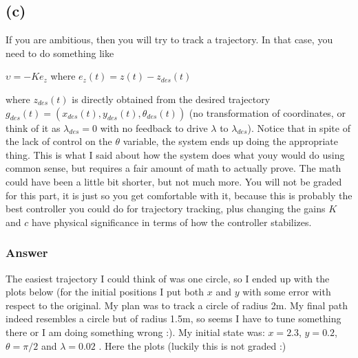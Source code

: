 \documentclass[10pt,a4paper]{article}
\begin{document}
\subsection*{(c)}
If you are ambitious, then you will try to track a trajectory. In that case, you need to do something like

\begin{center}
$\upsilon  = -Ke_{z}$ where $e_{z}(t) = z(t) - z_{des}(t)$
\end{center}

where $z_{des}(t)$ is directly obtained from the desired trajectory $g_{des}(t) = (x_{des}(t), y_{des}(t),\theta_{des}(t))$ (no transformation of coordinates, or think of it as $\lambda_{des} = 0$ with no feedback to drive $\lambda$ to $\lambda_{des}$). Notice that in spite of the lack of control on the $\theta$ variable, the system ends up doing the appropriate thing. This is what I said about how the system does what youy would do using common sense, but requires a fair amount of math to actually prove. The math could have been a little bit shorter, but not much more. You will not be graded for this part, it is just so you get comfortable with it, because this is probably the best controller you could do for trajectory tracking, plus changing the gains $K$ and $c$ have physical significance in terms of how the controller stabilizes.

\subsubsection*{Answer}
The easiest trajectory I could think of was one circle, so I ended up with the plots below (for the initial positions I put both $x$ and $y$ with some error with respect to the original. My plan was to track a circle of radius 2m. My final path indeed resembles a circle but of radius 1.5m, so seems I have to tune something there or I am doing something wrong :). My initial state was: $x= 2.3$, $y = 0.2$, $\theta = \pi/2$ and $\lambda = 0.02$ . Here the plots (luckily this is not graded :)
\end{document}
